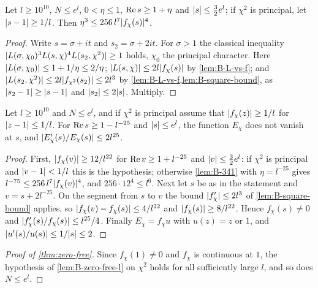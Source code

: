 \begin{lemma}\label{lem:B-341}
Let $l\ge10^{10}$, $N\le e^l$, $0<\eta\le1$, $\operatorname{Re} s\ge1+\eta$ and $\lvert s\rvert\le\frac32e^l$; if $\chi^2$ is
principal, let $\lvert s-1\rvert\ge1/l$. Then $\eta^3\le256\,l^7\lvert f_\chi(s)\rvert^4$.
\end{lemma}

\begin{proof}
Write $s=\sigma+it$ and $s_2=\sigma+2it$. For $\sigma>1$ the classical inequality
$\lvert L(\sigma,\chi_0)^3L(s,\chi)^4L(s_2,\chi^2)\rvert\ge1$ holds, $\chi_0$ the principal character. Here
$\lvert L(\sigma,\chi_0)\rvert\le1+1/\eta\le2/\eta$; $\lvert L(s,\chi)\rvert\le2l\lvert f_\chi(s)\rvert$ by
\cref{lem:B-L-vs-f}; and $\lvert L(s_2,\chi^2)\rvert\le2l\lvert f_{\chi^2}(s_2)\rvert\le2l^3$ by
\cref{lem:B-L-vs-f,lem:B-square-bound}, as $\lvert s_2-1\rvert\ge\lvert s-1\rvert$ and $\lvert s_2\rvert\le2\lvert s\rvert$. Multiply.
\end{proof}

\begin{lemma}\label{lem:B-zero-free-l}
Let $l\ge10^{10}$ and $N\le e^l$, and if $\chi^2$ is principal assume that $\lvert f_\chi(z)\rvert\ge1/l$ for
$\lvert z-1\rvert\le1/l$. For $\operatorname{Re} s\ge1-l^{-25}$ and $\lvert s\rvert\le e^l$, the function $E_\chi$ does not vanish
at $s$, and $\lvert E_\chi'(s)/E_\chi(s)\rvert\le2l^{25}$.
\end{lemma}

\begin{proof}
First, $\lvert f_\chi(v)\rvert\ge12/l^{22}$ for $\operatorname{Re} v\ge1+l^{-25}$ and $\lvert v\rvert\le\frac32e^l$: if
$\chi^2$ is principal and $\lvert v-1\rvert<1/l$ this is the hypothesis; otherwise \cref{lem:B-341} with
$\eta=l^{-25}$ gives $l^{-75}\le256\,l^7\lvert f_\chi(v)\rvert^4$, and $256\cdot12^4\le l^6$. Next let $s$ be as
in the statement and $v=s+2l^{-25}$. On the segment from $s$ to $v$ the bound $\lvert f_\chi'\rvert\le2l^3$ of
\cref{lem:B-square-bound} applies, so $\lvert f_\chi(v)-f_\chi(s)\rvert\le4/l^{22}$ and
$\lvert f_\chi(s)\rvert\ge8/l^{22}$. Hence $f_\chi(s)\ne0$ and $\lvert f_\chi'(s)/f_\chi(s)\rvert\le l^{25}/4$. Finally
$E_\chi=f_\chi u$ with $u(z)=z$ or $1$, and $\lvert u'(s)/u(s)\rvert\le1/\lvert s\rvert\le2$.
\end{proof}

\begin{proof}[Proof of \cref{thm:zero-free}]
Since $f_\chi(1)\neq0$ and $f_\chi$ is continuous at $1$, the hypothesis of \cref{lem:B-zero-free-l} on
$\chi^2$ holds for all sufficiently large $l$, and so does $N\le e^l$.
\end{proof}

